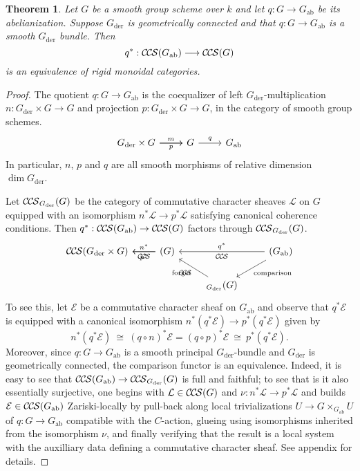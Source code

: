\documentclass[10pt]{amsart}
\theoremstyle{plain}
\newtheorem{theorem}{Theorem}[section]
\theoremstyle{definition}
\newcommand{\Fq}{k}
\newcommand{\der}{_{\operatorname{der}}}
\newcommand{\ab}{_{\operatorname{ab}}}
\newcommand{\iso}{{\ \cong\ }}
\newcommand{\cs}[1]{{\mathcal{#1}}}
\newcommand{\CCS}{{\mathcal{C\hskip-.8pt C\hskip-0.8pt S}}}
\begin{document}
 \begin{theorem}\label{thm:descent}
 Let $G$ be a smooth group scheme over $\Fq$ 
 and let $q : G \to G\ab$ be its abelianization. 
 Suppose $G\der$ is geometrically connected 
 and that $q: G \to G\ab$ is a smooth $G\der$ bundle.
Then
\[
q^*:  \CCS(G\ab) \longrightarrow \CCS(G)
\]
is an equivalence of rigid monoidal categories.
  \end{theorem}

\begin{proof}
The quotient $q : G \to G\ab$ is the coequalizer of left $G\der$-multiplication $n : G\der\times G \to G$ and projection $p : G\der\times G \to G$, in the category of smooth group schemes.
\[
\begin{tikzcd}
G\der\times G
 \arrow{r}[shift left]{m}
  \arrow{r}[shift right,swap]{p}
&
G 
\arrow{r}{q}
& 
G\ab
\end{tikzcd}
\]
In particular, $n$, $p$ and $q$ are all smooth morphisms of relative dimension $\dim G\der$.

Let $\CCS_{G\der}(G)$ be the category of commutative character sheaves $\cs{L}$ on $G$ equipped with an isomorphism $n^*\cs{L} \to p^*\cs{L}$ satisfying canonical coherence conditions.
Then $q^* : \CCS(G\ab) \to \CCS(G)$ factors through $\CCS_{G\der}(G)$. 
\[
\begin{tikzcd}
\CCS(G\der \times G)
& \arrow{l}[shift left,swap]{n^*}
  \arrow{l}[shift right]{p^*}
\CCS(G) 
&&\arrow{ll}[swap]{q^*} 
\CCS(G\ab) \arrow{dl}{\text{comparison}}\\
&& \arrow{ul}{\text{forget}} \CCS_{G\der}(G) & 
\end{tikzcd}
\]
To see this, let $\cs{E}$ be a commutative character sheaf on $G\ab$ and observe that $q^* \cs{E}$ is equipped with a canonical isomorphism $n^*(q^* \cs{E}) \to p^*(q^* \cs{E})$ given by
\[
n^* (q^*\cs{E}) \iso (q\circ n)^* \cs{E} = (q\circ p)^* \cs{E} \iso p^* (q^*\cs{E}).
\]
Moreover, since $q : G \to G\ab$ is a smooth principal $G\der$-bundle and $G\der$ is geometrically connected,
the comparison functor is an equivalence.
Indeed, it is easy to see that $\CCS(G\ab) \to \CCS_{G\der}(G)$ is full and faithful; to see that is it also essentially surjective, one begins with $\cs{L} \in \CCS(G)$ and $\nu : n^*\cs{L} \to p^*\cs{L}$ and builds $\cs{E}\in \CCS(G\ab)$ Zariski-locally by pull-back along local trivializations $U \to G\times_{G\ab} U$ of $q : G\to G\ab$ compatible with the $C$-action, glueing using isomorphisms inherited from the isomorphism $\nu$, and finally verifying that the result is a local system with the auxilliary data defining a commutative character sheaf. See appendix for details.


\end{proof}
\end{document}

